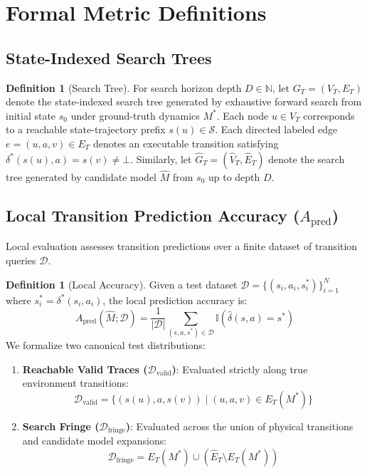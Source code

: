 \documentclass[11pt,a4paper]{article}
\theoremstyle{definition}
\newtheorem{definition}[theorem]{Definition}
\theoremstyle{remark}
\begin{document}
\section{Formal Metric Definitions}

\subsection{State-Indexed Search Trees}

\begin{definition}[Search Tree]
For search horizon depth $D \in \mathbb{N}$, let $G_T = (V_T, E_T)$ denote the state-indexed search tree generated by exhaustive forward search from initial state $s_0$ under ground-truth dynamics $M^*$.
Each node $u \in V_T$ corresponds to a reachable state-trajectory prefix $s(u) \in \mathcal{S}$. Each directed labeled edge $e = (u, a, v) \in E_T$ denotes an executable transition satisfying $\delta^*(s(u), a) = s(v) \ne \bot$.
Similarly, let $\widehat{G}_T = (\widehat{V}_T, \widehat{E}_T)$ denote the search tree generated by candidate model $\widehat{M}$ from $s_0$ up to depth $D$.
\end{definition}

\subsection{Local Transition Prediction Accuracy (\texorpdfstring{$A_{\text{pred}}$}{A_pred})}

Local evaluation assesses transition predictions over a finite dataset of transition queries $\mathcal{D}$.

\begin{definition}[Local Accuracy]
Given a test dataset $\mathcal{D} = \{ (s_i, a_i, s_i^*) \}_{i=1}^N$ where $s_i^* = \delta^*(s_i, a_i)$, the local prediction accuracy is:
\begin{equation}
    A_{\text{pred}}(\widehat{M}; \mathcal{D}) = \frac{1}{|\mathcal{D}|} \sum_{(s, a, s^*) \in \mathcal{D}} \mathbb{I}\left( \widehat{\delta}(s, a) = s^* \right)
\end{equation}
We formalize two canonical test distributions:
\begin{enumerate}
    \item \textbf{Reachable Valid Traces ($\mathcal{D}_{\text{valid}}$)}: Evaluated strictly along true environment transitions:
    \begin{equation}
        \mathcal{D}_{\text{valid}} = \{ (s(u), a, s(v)) \mid (u, a, v) \in E_T(M^*) \}
    \end{equation}
    \item \textbf{Search Fringe ($\mathcal{D}_{\text{fringe}}$)}: Evaluated across the union of physical transitions and candidate model expansions:
    \begin{equation}
        \mathcal{D}_{\text{fringe}} = E_T(M^*) \cup (\widehat{E}_T \setminus E_T(M^*))
    \end{equation}
\end{enumerate}
\end{definition}
\end{document}
